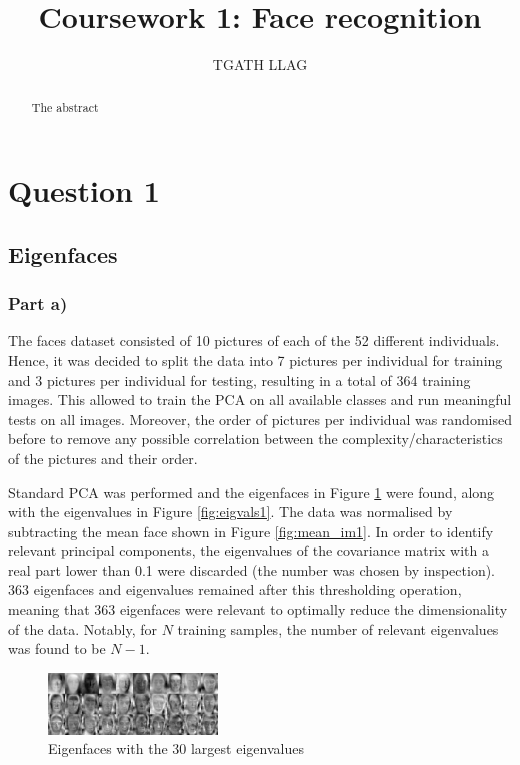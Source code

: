 \documentclass[10pt,technote]{IEEEtran}
\title{Coursework 1: Face recognition }
\author{TGATH LLAG}
\begin{document}
\maketitle
\begin{abstract}
The abstract
\end{abstract}

\section{Question 1}
\subsection{Eigenfaces}
\subsubsection{Part a)}
The faces dataset consisted of 10 pictures of each of the 52 different individuals. Hence, it was decided to split the data into 7 pictures per individual for training and 3 pictures per individual for testing, resulting in a total of 364 training images. This allowed to train the PCA on all available classes and run meaningful tests on all images. Moreover, the order of pictures per individual was randomised before to remove any possible correlation between the complexity/characteristics of the pictures and their order. 

Standard PCA was performed and the eigenfaces in Figure \ref{fig:eigfaces1} were found, along with the eigenvalues in Figure \ref{fig:eigvals1}. The data was normalised by subtracting the mean face shown in Figure \ref{fig:mean_im1}. In order to identify relevant principal components, the eigenvalues of the covariance matrix with a real part lower than 0.1 were discarded (the number was chosen by inspection). 363 eigenfaces and eigenvalues remained after this thresholding operation, meaning that 363 eigenfaces were relevant to optimally reduce the dimensionality of the data. Notably, for $N$ training samples, the number of relevant eigenvalues was found to be $N - 1$. 

\begin{figure}
    \centering
    \includegraphics[width=0.4\textwidth]{../results/ex1a/eigenfaces.png}
    \caption{Eigenfaces with the 30 largest eigenvalues}
    \label{fig:eigfaces1}
\end{figure}
\end{document}
